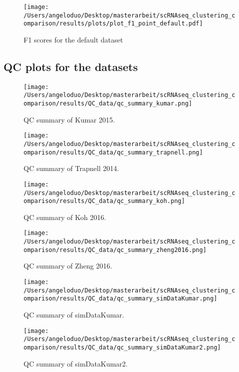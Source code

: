 \documentclass[12pt, a4paper]{article}\usepackage[]{graphicx}\usepackage[]{color}
\begin{document}
\begin{figure}[!h]
\centering
\texttt{[image: /Users/angeloduo/Desktop/masterarbeit/scRNAseq\_clustering\_comparison/results/plots/plot\_f1\_point\_default.pdf]}
\caption{F1 scores for the default  dataset }
\label{fig:f1poindef}
\end{figure}

\newpage


\subsection{QC plots for the datasets}

\begin{figure}[!h]
\centering
\texttt{[image: /Users/angeloduo/Desktop/masterarbeit/scRNAseq\_clustering\_comparison/results/QC\_data/qc\_summary\_kumar.png]}
\caption{QC summary of Kumar 2015. }
\label{fig:qckumar}
\end{figure}

\begin{figure}[!h]
\centering
\texttt{[image: /Users/angeloduo/Desktop/masterarbeit/scRNAseq\_clustering\_comparison/results/QC\_data/qc\_summary\_trapnell.png]}
\caption{QC summary of Trapnell 2014. }
\label{fig:qctrapnell}
\end{figure}

\begin{figure}[!h]
\centering
\texttt{[image: /Users/angeloduo/Desktop/masterarbeit/scRNAseq\_clustering\_comparison/results/QC\_data/qc\_summary\_koh.png]}
\caption{QC summary of Koh 2016. }
\label{fig:qckoh}
\end{figure}

\begin{figure}[!h]
\centering
\texttt{[image: /Users/angeloduo/Desktop/masterarbeit/scRNAseq\_clustering\_comparison/results/QC\_data/qc\_summary\_zheng2016.png]}
\caption{QC summary of Zheng 2016. }
\label{fig:qczheng}
\end{figure}

\begin{figure}[!h]
\centering
\texttt{[image: /Users/angeloduo/Desktop/masterarbeit/scRNAseq\_clustering\_comparison/results/QC\_data/qc\_summary\_simDataKumar.png]}
\caption{QC summary of simDataKumar. }
\label{fig:simDataKumar}
\end{figure}


\begin{figure}[!h]
\centering
\texttt{[image: /Users/angeloduo/Desktop/masterarbeit/scRNAseq\_clustering\_comparison/results/QC\_data/qc\_summary\_simDataKumar2.png]}
\caption{QC summary of simDataKumar2. }
\label{fig:simDataKumar}
\end{figure}
\end{document}
